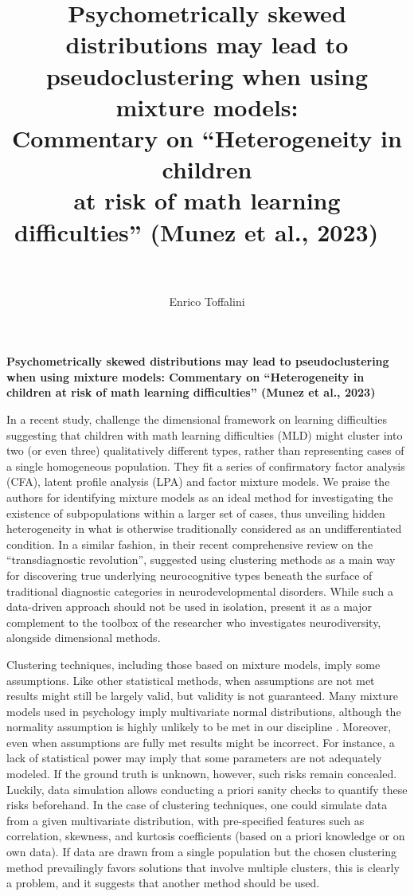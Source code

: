 \documentclass[letterpaper,11pt]{article}
\title{%
  \LARGE Psychometrically skewed distributions may lead to pseudoclustering when using mixture models: \\ 
   \Large Commentary on “Heterogeneity in children \\ at risk of math learning difficulties” \large (Munez et al., 2023) 
  \ \\
  \ \\
}
\author{Enrico Toffalini}
\affil{Department of General Psychology, University of Padova, Italy}
\begin{document}
\maketitle
\newpage

\begin{center} 
\textbf{Psychometrically skewed distributions may lead to pseudoclustering when using mixture models: Commentary on “Heterogeneity in children at risk of math learning difficulties” (Munez et al., 2023)}
\end{center}

In a recent study,  challenge the dimensional framework on learning difficulties suggesting that children with math learning difficulties (MLD) might cluster into two (or even three) qualitatively different types, rather than representing cases of a single homogeneous population. They fit a series of confirmatory factor analysis (CFA), latent profile analysis (LPA) and factor mixture models. We praise the authors for identifying mixture models as an ideal method for investigating the existence of subpopulations within a larger set of cases, thus unveiling hidden heterogeneity in what is otherwise traditionally considered as an undifferentiated condition. In a similar fashion, in their recent comprehensive review on the “transdiagnostic revolution”,  suggested using clustering methods as a main way for discovering true underlying neurocognitive types beneath the surface of traditional diagnostic categories in neurodevelopmental disorders. While such a data-driven approach should not be used in isolation,  present it as a major complement to the toolbox of the researcher who investigates neurodiversity, alongside dimensional methods.

Clustering techniques, including those based on mixture models, imply some assumptions. Like other statistical methods, when assumptions are not met results might still be largely valid, but validity is not guaranteed. Many mixture models used in psychology imply multivariate normal distributions, although the normality assumption is highly unlikely to be met in our discipline \cite{micceri1989unicorn}. Moreover, even when assumptions are fully met results might be incorrect. For instance, a lack of statistical power may imply that some parameters are not adequately modeled. If the ground truth is unknown, however, such risks remain concealed. Luckily, data simulation allows conducting a priori sanity checks to quantify these risks beforehand. In the case of clustering techniques, one could simulate data from a given multivariate distribution, with pre-specified features such as correlation, skewness, and kurtosis coefficients (based on a priori knowledge or on own data). If data are drawn from a single population but the chosen clustering method prevailingly favors solutions that involve multiple clusters, this is clearly a problem, and it suggests that another method should be used. 
\end{document}
